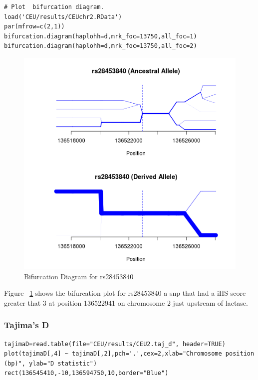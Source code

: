 \documentclass[a4paper,10pt]{article}
\begin{document}
\begin{verbatim}
# Plot  bifurcation diagram.
load('CEU/results/CEUchr2.RData')
par(mfrow=c(2,1))
bifurcation.diagram(haplohh=d,mrk_foc=13750,all_foc=1)
bifurcation.diagram(haplohh=d,mrk_foc=13750,all_foc=2)
\end{verbatim}
\begin{figure}
\centering
\includegraphics{pictures/bifurcationCEU.png}
\caption{Bifurcation Diagram for rs28453840}
\label{fig:bifurcationceu}
\end{figure}

\noindent
Figure ~\ref{fig:bifurcationceu} shows the bifurcation plot for rs28453840 a snp that had a iHS score greater that 3 at position 136522941 on chromosome 2 just upstream of lactase.

\subsubsection{Tajima's D}

\begin{verbatim}
tajimaD=read.table(file="CEU/results/CEU2.taj_d", header=TRUE)
plot(tajimaD[,4] ~ tajimaD[,2],pch='.',cex=2,xlab="Chromosome position (bp)", ylab="D statistic")
rect(136545410,-10,136594750,10,border="Blue") 
\end{verbatim}
\end{document}
